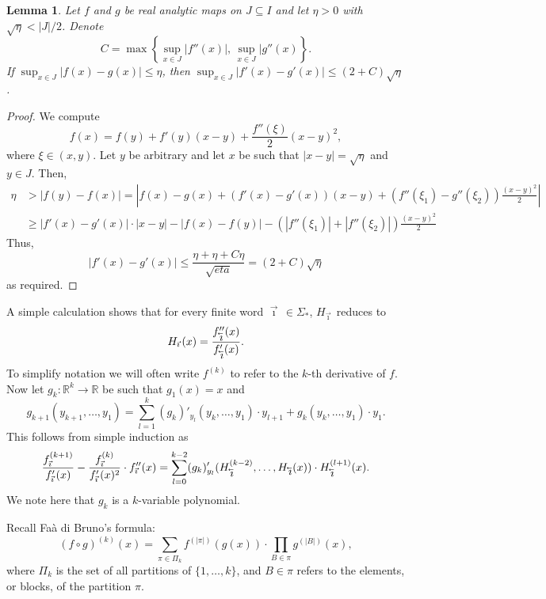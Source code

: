 \documentclass[12pt,]{article}
\newtheorem{lemma}[theorem]{Lemma}
\theoremstyle{definition}
\theoremstyle{remark}
\renewcommand{\Bbb}[1]{\mathbb{#1}}
\newcommand{\bbR}{{\Bbb R}}        %
\newcommand{\0}{\mathbf{0}}
\newcommand{\cev}[1]{\reflectbox{\ensuremath{\vec{\reflectbox{\ensuremath{#1}}}}}}
\newcommand{\bi}{\vec{\imath}\,}
\newcommand{\bbi}{\,\cev{\imath}}
\begin{document}
\begin{lemma}
  Let $f$ and $g$ be real analytic maps on $J\subseteq I$
  and let $\eta>0$ with $\sqrt{\eta}<|J|/2$.
  Denote
  \[
    C = \max\left\{\sup_{x\in J} |f''(x)|,\, \sup_{x\in J}|g''(x)\right\}.
  \]
  If $\sup_{x\in J} |f(x)-g(x)| \leq \eta$, then $\sup_{x\in J} |f'(x)-g'(x)|\leq (2+C)\sqrt{\eta}$.
\end{lemma}
\begin{proof}
  We compute
  \[
    f(x) = f(y) + f'(y)(x-y)+ \frac{f''(\xi)}{2}(x-y)^2,
  \]
  where $\xi\in(x,y)$.
  Let $y$ be arbitrary and let $x$ be such that $|x-y|=\sqrt{\eta}$ and $y\in J$.
  Then,
  \begin{align*}
    \eta &> |f(y)-f(x)| =
    \left|f(x)-g(x)+(f'(x)-g'(x))(x-y)+(f''(\xi_1)-g''(\xi_2))\frac{(x-y)^2}{2}\right|\\
	 &\geq |f'(x)-g'(x)|\cdot|x-y|-|f(x)-f(y)|-(|f''(\xi_1)|+|f''(\xi_2)|)\frac{(x-y)^2}{2}
  \end{align*}
  Thus,
  \[
    |f'(x)-g'(x)| \leq \frac{\eta+\eta+C \eta}{\sqrt{eta}} = (2+C)\sqrt{\eta}
  \]
  as required.
\end{proof}
A simple calculation shows that for every finite word $\bi\in\Sigma_*$, $H_{\bi}$ reduces to
\[
  H_{\bi}(x) = \frac{f''_{\bbi}(x)}{f'_{\bbi}(x)}.
\]
To simplify notation we will often write $f^{(k)}$ to refer to the $k$-th derivative of $f$.
Now let $g_k:\bbR^k\to \bbR$ be such that $g_1(x)=x$ and 
\[
  g_{k+1}(y_{k+1},\dots,y_1)=\sum_{l=1}^k (g_k)'_{y_l}(y_k,\dots,y_1)\cdot y_{l+1} +
  g_k(y_k,\dots,y_1)\cdot y_1.
\]
This follows from simple induction as
\[
  \frac{f_{\bi}^{(k+1)}}{f_{\bi}'(x)} - \frac{f_{\bi}^{(k)}}{f_{\bi}'(x)^2}\cdot f_{\bi}''(x)
  =\sum_{l=0}^{k-2}(g_k)'_{y_l}(H_{\bbi}^{(k-2)},\dots,H_{\bbi}(x)) \cdot H_{\bbi}^{(l+1)}(x).
\]
We note here that $g_k$ is a $k$-variable polynomial.

Recall Fa\`a di Bruno's formula:
\[
  (f\circ g)^{(k)}(x) = \sum_{\pi\in \Pi_k} f^{(|\pi|)}(g(x)) \cdot \prod_{B\in\pi}
  g^{(|B|)}(x),
\]
where $\Pi_k$ is the set of all partitions of $\{1,\dots,k\}$, and $B\in \pi$ refers to the
elements, or blocks, of the partition $\pi$.
\end{document}
